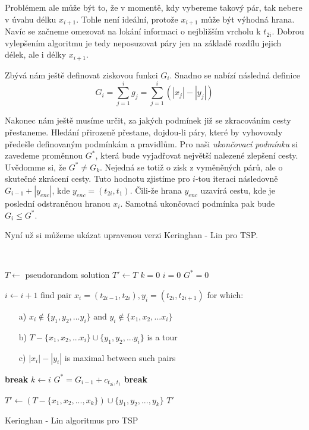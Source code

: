 \documentclass[
  printversion=false,
  joinlists=true,
  glossaries=true,
  figures=true,
  tables=true,
  sourcecodes=false,
  theorems=false,
  bibencoding=utf8,
  language=czech,
  encoding=utf8,
  program=infpvs,
  index=true,
  biblatex=true
]{kidiplom}
\begin{document}
\hspace{6.5mm}Problémem ale může být to, že v momentě, kdy vybereme takový pár, tak nebere v úvahu délku $x_{i+1}$. Tohle není ideální, protože $x_{i+1}$ může být výhodná hrana. Navíc se začneme omezovat na lokání informaci o nejbližším vrcholu k $t_{2i}$. Dobrou vylepšením algoritmu je tedy neposuzovat páry jen na základě rozdílu jejich délek, ale i délky $x_{i+1}$.

\hspace{6.5mm}Zbývá nám ještě definovat ziskovou funkci $G_i$. Snadno se nabízí následná definice
$$G_i = \sum_{j=1}^{i}g_j = \sum_{j=1}^{i}{(|x_j| - |y_j|)}$$

\hspace{6.5mm}Nakonec nám ještě musíme určit, za jakých podmínek již se zkracováním cesty přestaneme. Hledání přirozeně přestane, dojdou-li páry, které by vyhovovaly předešle definovaným podmínkám a pravidlům. Pro naši \textit{ukončovací podmínku} si zavedeme proměnnou $G^*$, která bude vyjadřovat největší nalezené zlepšení cesty. Uvědomme si, že $G^* \ne G_k$. Nejedná se totiž o zisk z vyměněných párů, ale o skutečné zkrácení cesty. Tuto hodnotu zjistíme pro $i$-tou iteraci následovně $G_{i-1} + |y_{enc}|$, kde $y_{enc}= (t_{2i}, t_1)$. Čili-že hrana $y_{enc}$ uzavírá cestu, kde je poslední odstraněnou hranou $x_i$. Samotná ukončovací podmínka pak bude $G_i \le G^*$.

\hspace{6.5mm}Nyní už si můžeme ukázat upravenou verzi Keringhan - Lin pro TSP.
\newline

{\LinesNumbered\SetAlgoNoLine\
\begin{algorithm}[H]
%
$T \leftarrow$ pseudorandom solution\;
$T' \leftarrow T$\;
$k = 0$\;
$i = 0$\;
$G^* = 0$ \;
{
$i \leftarrow i + 1$\;
find pair $x_{i} = (t_{2i-1}, t_{2i}), y_i = (t_{2i}, t_{2i+1})$ for which:
{\begin{itemize}
\item[a)] $x_{i} \notin \{y_1, y_2,... y_i\}$ and  $y_i \notin \{x_1, x_2,... x_i\}$ 
\item[b)] $T - \{x_1, x_2,... x_i\} \cup \{y_1, y_2,... y_i\}$ is a tour
\item[c)] $|x_{i}| - |y_i|$ is maximal between such pairs
\end{itemize}}
	{\textbf{break}\;}
	{$k \leftarrow i$\;
	 $G^* = G_{i-1} + c_{t_{2i},t_1}$\;}
	{\textbf{break}\;}
}
$T' \leftarrow (T - \{x_1, x_2, ..., x_k\}) \cup \{y_1, y_2, ..., y_k\}$\;
\Return $T'$\;
\caption{Keringhan - Lin algoritmus pro TSP}
\end{algorithm}}\leavevmode\newline
\end{document}
